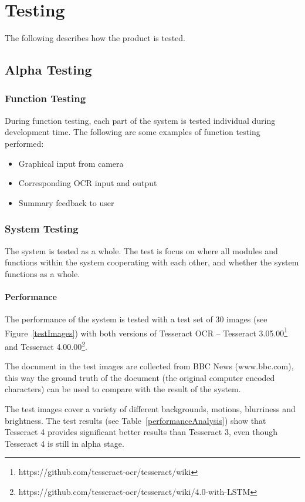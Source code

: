 \chapter{Testing}

	The following describes how the product is tested.

	\section{Alpha Testing}
		\subsection{Function Testing}

		During function testing, each part of the system is tested individual during development time.
		The following are some examples of function testing performed:
		\begin{itemize}
			\item Graphical input from camera
			\item Corresponding OCR input and output
			\item Summary feedback to user
		\end{itemize}

		\subsection{System Testing}

		The system is tested as a whole. The test is focus on where all modules and functions within the system cooperating with each other, and whether the system functions as a whole.
		
		\subsubsection{Performance}
		The performance of the system is tested with a test set of 30 images (see Figure~\ref{testImages}) with both versions of Tesseract OCR – Tesseract 3.05.00\footnote{https://github.com/tesseract-ocr/tesseract/wiki} and Tesseract 4.00.00\footnote{https://github.com/tesseract-ocr/tesseract/wiki/4.0-with-LSTM}.
		
		The document in the test images are collected from BBC News (www.bbc.com), this way the ground truth of the document (the original computer encoded characters) can be used to compare with the result of the system.
		
The test images cover a variety of different backgrounds, motions, blurriness and brightness. The test results (see Table~\ref{performanceAnalysis}) show that Tesseract 4 provides significant better results than Tesseract 3, even though Tesseract 4 is still in alpha stage.
		
